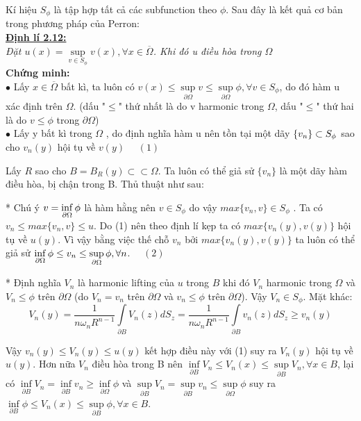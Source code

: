 Kí hiệu  $S_{\phi}$  là tập hợp tất cả các subfunction theo $\phi$. Sau đây là kết quả cơ bản trong phương pháp của Perron:\\
{\bf \underline{Định lí 2.12:}}
\\
{\it Đặt $u(x) = \mathop {\sup }\limits_{v \in S_\phi  } v(x),\forall x\in \overline \Omega$. Khi đó u điều hòa trong $\Omega$}\\
{\bf Chứng minh:}
\\
$ \bullet $  Lấy $x\in \overline \Omega$ bất kì, ta luôn có $
v(x) \le \mathop {\sup }\limits_{\partial \Omega } v \le \mathop {\sup }\limits_{\partial \Omega } \phi ,\forall v \in S_\phi  $, do đó hàm u xác định trên $\Omega$. (dấu "$\le$" thứ nhất là do v harmonic trong $\Omega$, dấu "$\le$" thứ hai là do $v\le \phi$ trong $\partial \Omega$)
\\
$ \bullet$ Lấy y bất kì trong $\Omega$ , do định nghĩa hàm u nên tồn tại một dãy $
{\rm{\{ }}v_n {\rm{\} }} \subset S_\phi  $ sao cho ${v_n(y)}$ hội tụ về $v(y)$     $\quad (1)$

Lấy $R$ sao cho $B = B_R (y) \subset  \subset \Omega $. Ta luôn có thể giả sử $\{v_n\}$ là một dãy hàm điều hòa, bị chận trong B. Thủ thuật như sau:

* Chú ý $v=\mathop {{\rm{inf}}}\limits_{\partial \Omega } \phi$ là hàm hằng nên $v\in S_\phi$ do vậy $max\{v_n,v\}\in S_\phi$ . Ta có $v_n\le max\{v_n,v\}\le u$. Do (1) nên theo định lí kẹp ta có $max\{v_n(y),v(y)\}$ hội tụ về $u(y)$. Vì vậy bằng việc thế chỗ $v_n$ bởi $max\{v_n(y),v(y)\}$ ta luôn có thể giả sử 
$\mathop {{\rm{inf}}}\limits_{\partial \Omega } \phi  \le v_n  \le \mathop {\sup }\limits_{\partial \Omega } \phi ,\forall n$. $\quad (2)$

* Định nghĩa $V_n$ là harmonic lifting của $u$ trong $B$ khi đó $V_n$ harmonic trong $\Omega$ và $V_n\le \phi$ trên $\partial \Omega$ (do $V_n=v_n$ trên $\partial \Omega$ và $v_n\le \phi$ trên $\partial \Omega$). Vậy $V_n\in S_\phi$. Mặt khác: 
\[
V_n (y) = \frac{1}{{n\omega _n R^{n - 1} }}\int\limits_{\partial B} {V_n (z)dS_z }  = \frac{1}{{n\omega _n R^{n - 1} }}\int\limits_{\partial B} {v_n (z)dS_z }  \ge v_n (y)
\]

Vậy $v_n(y)\le V_n(y)\le u(y)$ kết hợp điều này với (1) suy ra $V_n(y)$ hội tụ về $u(y)$. Hơn nữa
$V_n$ điều hòa trong B nên $
\mathop {\inf }\limits_{\partial B } V_n  \le V_n (x) \le \mathop {\sup }\limits_{\partial B } V_n ,\forall x \in B$, lại có $\mathop {\inf }\limits_{\partial B} V_n  = \mathop {\inf }\limits_{\partial B} v_n  \ge \mathop {\inf }\limits_{\partial \Omega } \phi $ và $\mathop {\sup }\limits_{\partial B} V_n  = \mathop {\sup }\limits_{\partial B} v_n  \le \mathop {\sup }\limits_{\partial \Omega } \phi $ suy ra $
\mathop {\inf }\limits_{\partial B } \phi  \le V_n (x) \le \mathop {\sup }\limits_{\partial B } \phi ,\forall x \in B$.

